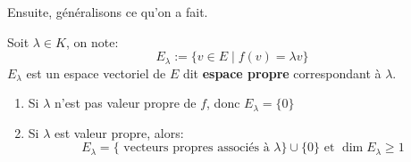Ensuite, généralisons ce qu'on a fait. 
\begin{definition}
    Soit $\lambda \in K$, on note:
    \[
        E_{\lambda} := \{v \in E \mid f(v) = \lambda v \}
    \] 
    $E_{\lambda}$ est un espace vectoriel de $E$ dit  \textbf{espace propre} correspondant à $\lambda$.
\end{definition}
\begin{remark}
   \begin{enumerate}
       \item Si $\lambda$ n'est pas valeur propre de $f$, donc  $E_\lambda = \{0\}$
       \item Si  $\lambda$ est valeur propre, alors:
            \[
                E_\lambda = \{ \text{ vecteurs propres associés à } \lambda \} \cup \{0\} \text{ et } \dim E_\lambda \ge 1
           \] 
   \end{enumerate} 
\end{remark}


%
%
%
%
%
%
%
